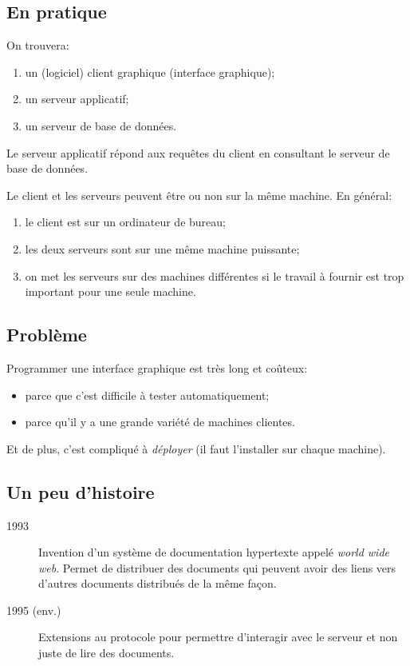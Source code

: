 \subsection{En pratique}
On trouvera:
\begin{enumerate}
\item un (logiciel) client graphique (interface graphique);
\item un serveur applicatif;
\item un serveur de base de données.
\end{enumerate}

Le serveur applicatif répond aux requêtes du client en consultant le
serveur de base de données.

Le client et les serveurs peuvent être ou non sur la même machine. En
général:
\begin{enumerate}
\item le client est sur un ordinateur de bureau;
\item les deux serveurs sont sur une même machine puissante;
\item on met les serveurs sur des machines différentes si le travail à
  fournir est trop important pour une seule machine.
\end{enumerate}

\subsection{Problème}

Programmer une interface graphique est très long et coûteux:
\begin{itemize}
\item parce que c'est difficile à tester automatiquement;
\item parce qu'il y a une grande variété de machines  clientes.
\end{itemize}
Et de plus, c'est compliqué à \emph{déployer} (il faut l'installer sur chaque
machine).
\subsection{Un peu d'histoire}

\begin{description}
\item[1993] Invention d'un système de documentation hypertexte appelé
  \textit{world wide web}. Permet de distribuer des documents qui
  peuvent avoir des liens vers d'autres documents distribués de la
  même façon.
\item[1995 (env.)] Extensions au protocole pour permettre d'interagir
  avec le serveur et non juste de lire des documents.
\end{description}

